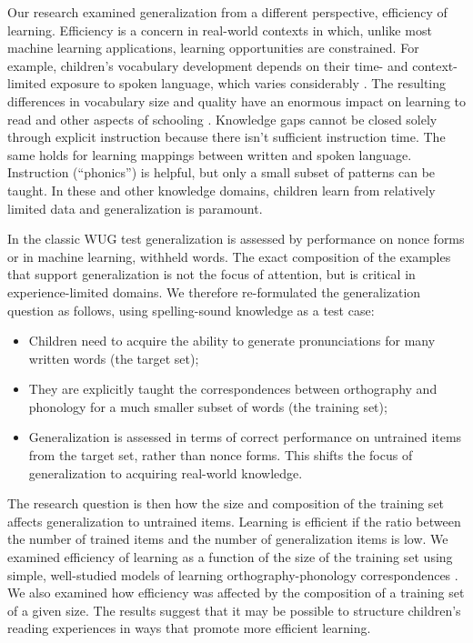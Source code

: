 \documentclass[10pt,letterpaper]{article}
\begin{document}
Our research examined generalization from a different perspective, efficiency of learning.   Efficiency is a concern in real-world contexts in which, unlike most machine learning applications, learning opportunities are constrained. For example, children's vocabulary development depends on their time- and context-limited exposure to spoken language, which varies considerably \cite{Hart1995,Gilkerson2017}.  The resulting differences in vocabulary size and quality have an enormous impact on learning to read and other aspects of schooling \cite{Seidenberg2017}.  Knowledge gaps cannot be closed solely through explicit instruction because there isn't sufficient instruction time. The same holds for learning mappings between written and spoken language. Instruction (``phonics'') is helpful, but only a small subset of patterns can be taught. In these and other knowledge domains, children learn from relatively limited data and generalization is paramount.

In the classic WUG test generalization is assessed by performance on nonce forms or in machine learning, withheld words. The exact composition of the examples that support generalization is not the focus of attention, but is critical in experience-limited domains. We therefore re-formulated the generalization question as follows, using spelling-sound knowledge as a test case: 

\begin{itemize}
	\item Children need to acquire the ability to generate pronunciations for many written words (the target set);  
	\item They are explicitly taught the correspondences between orthography and phonology for a much smaller subset of words (the training set);
	\item Generalization is assessed in terms of correct performance on untrained items from the target set, rather than nonce forms. This shifts the focus of generalization to acquiring real-world knowledge.
\end{itemize}

The research question is then how the size and composition of the training set affects generalization to untrained items. Learning is efficient if the ratio between the number of trained items and the number of generalization items is low. We examined efficiency of learning as a function of the size of the training set using simple, well-studied models of learning orthography-phonology correspondences \cite{Seidenberg1989,Harm1999}. We also examined how efficiency was affected by the composition of a training set of a given size. The results suggest that it may be possible to structure children's reading experiences in ways that promote more efficient learning.
\end{document}

